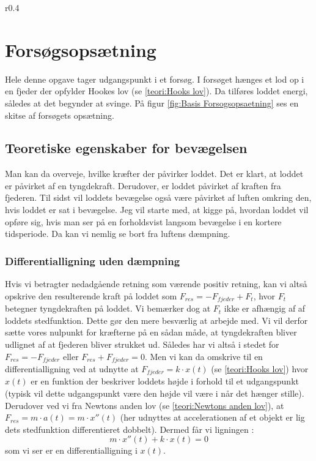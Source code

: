 \begin{wrapfigure}{r}{0.4\textwidth}
\centering
{}%

\caption{Skitse af forsøgsopsætning.}
\label{fig:Basis Forsogsopsaetning}
\end{wrapfigure} 


\section{Forsøgsopsætning}\label{teori: opsatning af differentialligninger}
Hele denne opgave tager udgangspunkt i et forsøg.
I forsøget hænges et lod op i en fjeder der opfylder Hookes lov (se \ref{teori:Hooks lov}). 
Da tilføres loddet energi, således at det begynder at svinge. 
På figur \ref{fig:Basis Forsogsopsaetning} ses en skitse af forsøgets opsætning.



\subsection{Teoretiske egenskaber for bevægelsen}
Man kan da overveje, hvilke kræfter der påvirker loddet. 
Det er klart, at loddet er påvirket af en tyngdekraft. 
Derudover, er loddet påvirket af kraften fra fjederen.
Til sidst vil loddets bevægelse også være påvirket af luften omkring den, hvis loddet er sat i bevægelse. 
Jeg vil starte med, at kigge på, hvordan loddet vil opføre sig, hvis man ser på en forholdsvist langsom bevægelse i en kortere tidsperiode.
Da kan vi nemlig se bort fra luftens dæmpning. 

\subsubsection{Differentialligning uden dæmpning}\label{teori: Opstilling ligning uden dampning}
Hvis vi betragter nedadgående retning som værende positiv retning, kan vi altså opskrive den resulterende kraft på loddet som $F_{res} = -F_{fjeder}+F_{t}$, hvor $F_t$ betegner tyngdekraften på loddet. 
Vi bemærker dog at $F_t$ ikke er afhængig af af loddets stedfunktion. 
Dette gør den mere besværlig at arbejde med. 
Vi vil derfor sætte vores nulpunkt for kræfterne på en sådan måde, at tyngdekraften bliver udlignet af at fjederen bliver strukket ud. 
Således har vi altså i stedet for $F_{res}=-F_{fjeder}$ eller $F_{res}+F_{fjeder}=0$.
Men vi kan da omskrive til en differentialligning ved at udnytte at $F_{fjeder}=k \cdot x(t)$ (se \ref{teori:Hooks lov}) hvor $x(t)$ er en funktion der beskriver loddets højde i forhold til et udgangspunkt (typisk vil dette udgangspunkt være den højde vil være i når det hænger stille).  
Derudover ved vi fra Newtons anden lov (se \ref{teori:Newtons anden lov}), at $F_{res}=m\cdot a(t) = m \cdot x''(t)$ 
(her udnyttes at accelerationen af et objekt er lig dets stedfunktion differentieret dobbelt). 
Dermed får vi ligningen :
$$m\cdot x''(t)+k\cdot x(t)=0$$ 
som vi ser er en differentialligning i $x(t)$.

